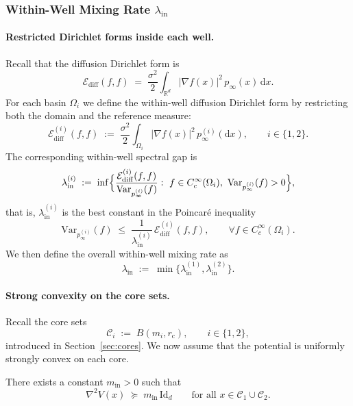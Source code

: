 \subsubsection{Within-Well Mixing Rate \texorpdfstring{$\lambda_{\mathrm{in}}$}{lambda_in}}
\label{sec:within-well}



\paragraph{Restricted Dirichlet forms inside each well.}
Recall that the diffusion Dirichlet form is
\[
\mathcal E_{\mathrm{diff}}(f,f)
\;=\;
\frac{\sigma^2}{2}\int_{\mathbb R^d} |\nabla f(x)|^2\,p_\infty(x)\,\mathrm dx.
\]
For each basin \(\Omega_i\) we define the within-well diffusion Dirichlet form
by restricting both the domain and the reference measure:
\[
\mathcal E_{\mathrm{diff}}^{(i)}(f,f)
\;:=\;
\frac{\sigma^2}{2}\int_{\Omega_i} |\nabla f(x)|^2\,p_\infty^{(i)}(\mathrm dx),
\qquad
i\in\{1,2\}.
\]
The corresponding within-well spectral gap is
\[
\lambda_{\mathrm{in}}^{(i)}
\;:=\;
\inf\Bigl\{
\frac{\mathcal E_{\mathrm{diff}}^{(i)}(f,f)}{\mathrm{Var}_{p_\infty^{(i)}}(f)}
:\ f\in C_c^\infty(\Omega_i),\ \mathrm{Var}_{p_\infty^{(i)}}(f)>0
\Bigr\},
\]
that is, \(\lambda_{\mathrm{in}}^{(i)}\) is the best constant in the Poincar\'e
inequality
\begin{equation}\label{eq:local-Poincare-well}
\mathrm{Var}_{p_\infty^{(i)}}(f)
\;\le\;
\frac{1}{\lambda_{\mathrm{in}}^{(i)}}\,\mathcal E_{\mathrm{diff}}^{(i)}(f,f),
\qquad
\forall f\in C_c^\infty(\Omega_i).
\end{equation}
We then define the overall within-well mixing rate as
\[
\lambda_{\mathrm{in}}
\;:=\;
\min\bigl\{\lambda_{\mathrm{in}}^{(1)},\lambda_{\mathrm{in}}^{(2)}\bigr\}.
\]

\paragraph{Strong convexity on the core sets.}
Recall the core sets
\[
\mathcal C_i \;:=\; B(m_i,r_{\mathrm c}),
\qquad i\in\{1,2\},
\]
introduced in Section~\ref{sec:cores}.
We now assume that the potential is uniformly strongly convex on each core.

\begin{assumption}\label{ass:core-strong-convex}
There exists a constant \(m_{\mathrm{in}}>0\) such that
\[
\nabla^2 V(x)
\;\succeq\;
m_{\mathrm{in}}\,\mathrm{Id}_d
\qquad
\text{for all }x\in\mathcal C_1\cup\mathcal C_2.
\]
\end{assumption}


